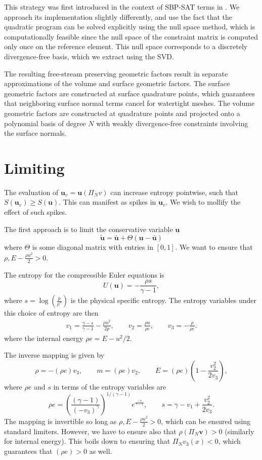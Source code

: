 \documentclass[preprint,10pt]{article}
\theoremstyle{definition}
\theoremstyle{lemma}
\theoremstyle{theorem}
\theoremstyle{assumption}
\newcommand{\LRp}[1]{\left( #1 \right)}
\begin{document}
This strategy was first introduced in the context of SBP-SAT terms in \cite{fernandez2016simultaneous}.  We approach its implementation slightly differently, and use the fact that the quadratic program can be solved explicitly using the null space method, which is computationally feasible since the null space of the constraint matrix is computed only once on the reference element.  This null space corresponds to a discretely divergence-free basis, which we extract using the SVD.  

The resulting free-stream preserving geometric factors result in separate approximations of the volume and surface geometric factors.  The surface geometric factors are constructed at surface quadrature points, which guarantees that neighboring surface normal terms cancel for watertight meshes.  The volume geometric factors are constructed at quadrature points and projected onto a polynomial basis of degree $N$ with weakly divergence-free constraints involving the surface normals.


\section{Limiting}

The evaluation of $\bm{u}_v = \bm{u}\LRp{\Pi_N v}$ can increase entropy pointwise, such that $S(\bm{u}_v) \geq S(\bm{u})$.  This can manifest as spikes in $\bm{u}_v$.  We wish to mollify the effect of such spikes.  

The first approach is to limit the conservative variable $\bm{u}$
\[
\tilde{\bm{u}} = \bar{\bm{u}} + \Theta (\bm{u} - \bar{\bm{u}})
\]
where $\Theta$ is some diagonal matrix with entries in $[0,1]$.  We want to ensure that $\rho, E-\frac{\rho u^2}{2} > 0$.  

The entropy for the compressible Euler equations is 
\[
U(\bm{u}) = -\frac{\rho s}{\gamma-1},
\]
where $s = \log\LRp{\frac{p}{\rho^\gamma}}$ is the physical specific entropy.  The entropy variables under this choice of entropy are then
\begin{align*}
v_1 = \frac{\gamma-s}{\gamma-1} - \frac{\rho u^2}{2p}, \qquad v_2 = \frac{\rho u}{\rho e}, \qquad v_3 = -\frac{\rho}{\rho e}.
\end{align*}
where the internal energy $\rho e = E - u^2/2$.

The inverse mapping is given by 
\[
\rho = -(\rho e) v_3, \qquad m = (\rho e) v_2, \qquad E = (\rho e)\LRp{1 - \frac{v_2^2}{2 v_3}},
\]
where $\rho e$ and $s$ in terms of the entropy variables are 
\[
\rho e = \LRp{\frac{(\gamma-1)}{\LRp{-v_3}^{\gamma}}}^{1/(\gamma-1)}e^{\frac{-s}{\gamma-1}}, \qquad s = \gamma - v_1 + \frac{v_2^2}{2v_3}.
\]
The mapping is invertible so long as $\rho, E-\frac{\rho u^2}{2} > 0$, which can be ensured using standard limiters.  However, we have to ensure also that $\rho(\Pi_N\bm{v}) > 0$ (similarly for internal energy).  This boils down to ensuring that $\Pi_N v_3(x) < 0$, which guarantees that $(\rho e) > 0$ as well.   
\end{document}
